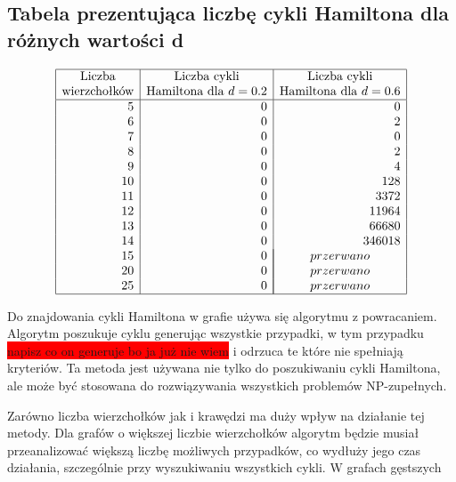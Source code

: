 \documentclass[polish,polish,a4paper]{article}
\begin{document}
\begin{spacing}{1.25}
\begin{spacing}{1.3}
	{\centering \subsection*{Tabela prezentująca liczbę cykli Hamiltona dla różnych wartości d}}
	\begin{equation*}
	\begin{array}{|r|r|r|}
	\hline
	\multicolumn{1}{|c|}{$Liczba$}&
	\multicolumn{1}{c|}{$Liczba cykli$}&
	\multicolumn{1}{c|}{$Liczba cykli$}\\
	\multicolumn{1}{|c|}{$wierzchołków$}&
	\multicolumn{1}{c|}{$Hamiltona dla $ d=0.2}&
	\multicolumn{1}{c|}{$Hamiltona dla $ d=0.6}\\
	\hline
	5&0&0\\
	6&0&2\\
	7&0&0\\
	8&0&2\\
	9&0&4\\
	10&0&128\\
	11&0&3372\\
	12&0&11964\\
	13&0&66680\\
	14&0&346018\\
	15&0&\multicolumn{1}{|c|}{przerwano}\\
	20&0&\multicolumn{1}{|c|}{przerwano}\\
	25&0&\multicolumn{1}{|c|}{przerwano}\\
	
	\hline
	\end{array}
	\end{equation*}
\end{spacing}

Do znajdowania cykli Hamiltona w grafie używa się algorytmu z powracaniem. Algorytm poszukuje cyklu generując wszystkie przypadki, w tym przypadku {\LARGE \colorbox{red}{napisz co on generuje bo ja już nie wiem}} i odrzuca te które nie spełniają kryteriów. Ta metoda jest używana nie tylko do poszukiwaniu cykli Hamiltona, ale może być stosowana do rozwiązywania wszystkich problemów NP-zupełnych.

Zarówno liczba wierzchołków jak i krawędzi ma duży wpływ na działanie tej metody.
Dla grafów o większej liczbie wierzchołków algorytm będzie musiał przeanalizować większą liczbę możliwych przypadków, co wydłuży jego czas działania, szczególnie przy wyszukiwaniu wszystkich cykli. W grafach gęstszych 
\end{spacing}
	\newpage
	\tableofcontents
\end{document}
